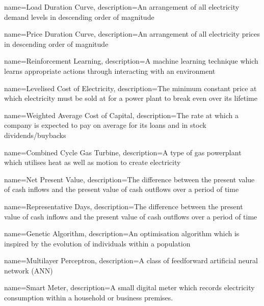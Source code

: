 {
	name=Load Duration Curve,
	description={An arrangement of all electricity demand levels in descending order of magnitude}
}




{
	name=Price Duration Curve,
	description={An arrangement of all electricity prices in descending order of magnitude}
}


{
	name=Reinforcement Learning,
	description={A machine learning technique which learns appropriate actions through interacting with an environment}
}



{
	name=Levelised Cost of Electricity,
	description={The minimum constant price at which electricity must be sold at for a power plant to break even over its lifetime}
}



{
	name=Weighted Average Cost of Capital,
	description={The rate at which a company is expected to pay on average for its loans and in stock dividends/buybacks}
}


{
	name=Combined Cycle Gas Turbine,
	description={A type of gas powerplant which utilises heat as well as motion to create electricity}
}



{
	name=Net Present Value,
	description={The difference between the present value of cash inflows and the present value of cash outflows over a period of time}
}


{
	name=Representative Days,
	description={The difference between the present value of cash inflows and the present value of cash outflows over a period of time}
}


{
	name=Genetic Algorithm,
	description={An optimisation algorithm which is inspired by the evolution of individuals within a population}
}



{
	name=Multilayer Perceptron,
	description={A class of feedforward artificial neural network (ANN)}
}


{
	name=Smart Meter,
	description={A small digital meter which records electricity consumption within a household or business premises.}
}






